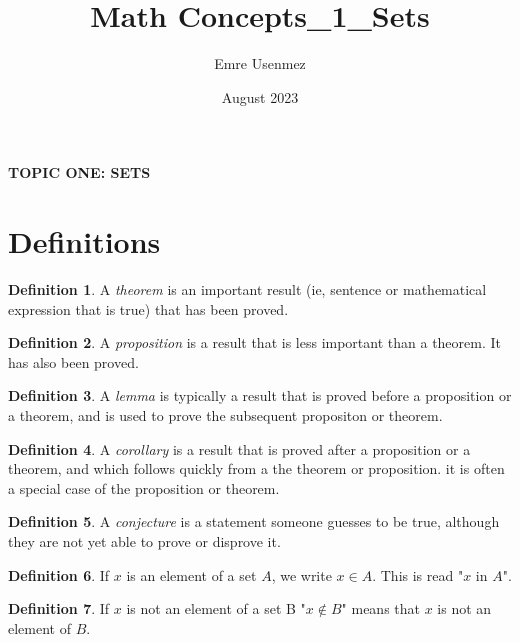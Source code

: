 \documentclass{amsart} %
\title{Math Concepts_1_Sets}
\author{Emre Usenmez}
\date{August 2023}
\theoremstyle{definition} %
\newtheorem*{dfn}{Definition} %
\theoremstyle{definition}
\theoremstyle{remark} %
\begin{document}


\begin{center}
      \textbf{TOPIC ONE: SETS}
\end{center}


\section{\textbf{Definitions}}

\begin{dfn}
 \quad A \emph{theorem} is an important result (ie, sentence or mathematical expression that is true) that has been proved.
\end{dfn}

\begin{dfn}
 \quad A \emph{proposition} is a result that is less important than a theorem. It has also been proved.
\end{dfn}

\begin{dfn}
 \quad A \emph{lemma} is typically a result that is proved before a proposition or a theorem, and is used to prove the subsequent propositon or theorem.
\end{dfn}

\begin{dfn}
 \quad A \emph{corollary} is a result that is proved after a proposition or a theorem, and which follows quickly from a the theorem or proposition. it is often a special case of the proposition or theorem.
\end{dfn}

\begin{dfn}
 \quad A \emph{conjecture} is a statement someone guesses to be true, although they are not yet able to prove or disprove it.
\end{dfn}

\begin{dfn}
\boxed{\in} \quad If $x$ is an element of a set $A$, we write $x \in A$. This is read "$x$ in $A$". %
\end{dfn}

\begin{dfn}
\boxed{\not\in} \quad If $x$ is not an element of a set B "$x \not\in B$" means that $x$ is not an element of $B$.
\end{dfn}
\end{document}
